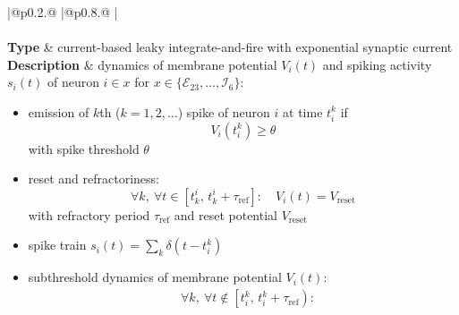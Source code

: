 \documentclass[10pt,a4paper,twoside,american]{article}
\theoremstyle{definitionstyle}
\newcommand{\tauR}{\tau_\text{ref}}
\begin{document}
\begin{table}[H]
\renewcommand{\arraystretch}{1.2}
\begin{tabular}{
  |@{\hspace*{\marg}}p{}@{\hspace*{\marg}}
  |@{\hspace*{\marg}}p{}@{\hspace*{\marg}}
  |}
  \hline 
  \\
  \hline
  \\
  \hline
  \textbf{Type} & current-based leaky integrate-and-fire with exponential synaptic current \\
  \hline 
  \textbf{Description} & dynamics of membrane potential $V_{i}(t)$ and spiking activity $s_i(t)$ of neuron $i\in x$ for $x\in\{\mathcal{E}_{23},\ldots,\mathcal{I}_{6}\}$:
                         \begin{itemize}
                         \item emission of $k$th ($k=1,2,\ldots$) spike of neuron $i$ at time $t_{i}^{k}$ if
                           \begin{equation*}
                             V_{i}\left(t_{i}^{k}\right)\geq\theta  
                           \end{equation*}
                           with spike threshold $\theta$
                         \item reset and refractoriness:
                           \begin{equation*}
				   \forall{}k,\ \forall t \in \left[t_{k}^{i},\,t_{k}^{i}+\tauR\right]:\quad V_{i}(t)=V_\text{reset}  
                           \end{equation*}
                            with refractory period $\tauR$ and reset potential $V_\text{reset}$
                         \item spike train $\displaystyle s_i(t)=\sum_k \delta(t-t_i^k)$
                         \item subthreshold dynamics of membrane potential $V_{i}(t)$:
                           \begin{equation}
			     \label{eq:membrane_potential}
                             \begin{aligned}
                               &\forall{}k,\ \forall t \notin \left[t_{i}^{k},\,t_{i}^{k}+\tauR\right):\\

\end{aligned}
\end{equation}
\end{itemize}
\end{tabular}
\end{table}
\end{document}
